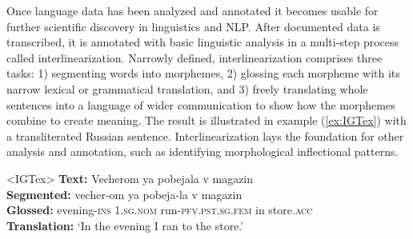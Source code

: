 Once language data has been analyzed and annotated it becomes usable for further scientific discovery in linguistics and NLP. After documented data is transcribed, it is annotated with basic linguistic analysis in a multi-step process called interlinearization. Narrowly defined, interlinearization comprises three tasks: 1) segmenting words into morphemes, 2) glossing each morpheme with its narrow lexical or grammatical translation, and 3) freely translating whole sentences into a language of wider communication to show how the morphemes combine to create meaning. The result is illustrated in example (\ref{ex:IGTex}) with a transliterated Russian sentence. Interlinearization lays the foundation for other analysis and annotation, such as identifying morphological inflectional patterns.  

\begin{singlespace}
\pex<IGTex>   
\label{ex:IGTex}
\textbf{Text:} \hspace{14 mm} Vecherom \hspace{4.75 mm} ya \hspace{13 mm} pobejala \hspace{21 mm} v \hspace{2 mm} magazin \\
\textbf{Segmented:} \hspace{2 mm} vecher-om \hspace{4 mm} ya \hspace{13 mm} pobeja-la \hspace{20 mm} v \hspace{2 mm} magazin \\
\textbf{Glossed:} \hspace{8.5 mm} evening-\textsc{ins} \hspace{1 mm} 1.\textsc{sg.nom} \hspace{1 mm} run-\textsc{pfv.pst.sg.fem} \hspace{1 mm} in \hspace{1 mm} store.\textsc{acc} \\
\textbf{Translation:} \hspace{1 mm} `In the evening I ran to the store.' \\
\xe
\end{singlespace}


